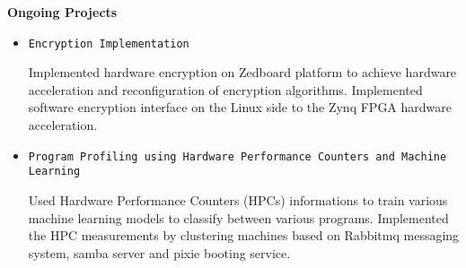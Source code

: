 \documentclass[]{article}
\begin{document}
\noindent \textbf{Ongoing Projects}
\begin{itemize}

		\item \verb+Encryption Implementation+

		Implemented hardware encryption on Zedboard platform to achieve
hardware acceleration and reconfiguration of encryption algorithms.
Implemented software encryption interface on the Linux side to the Zynq FPGA
hardware acceleration.

		\item \verb+Program Profiling using Hardware Performance Counters and Machine Learning+
		
		Used Hardware Performance Counters (HPCs) informations to train various
machine learning models to classify between various programs. Implemented the HPC
measurements by clustering machines based on Rabbitmq messaging system, samba
server and pixie booting service.

\end{itemize}

% 
\end{document}

